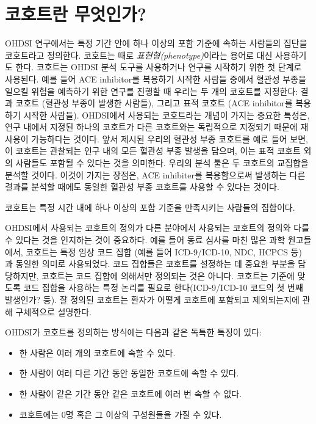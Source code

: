 \documentclass[11pt]{book}
\providecommand{\tightlist}{%
  \setlength{\itemsep}{0pt}\setlength{\parskip}{0pt}}
\theoremstyle{definition}
\theoremstyle{definition}
\theoremstyle{definition}
\theoremstyle{remark}
\let\BeginKnitrBlock\begin \let\EndKnitrBlock\end
\begin{document}
\section{코호트란 무엇인가?}\label{-}

OHDSI 연구에서는 특정 기간 안에 하나 이상의 포함 기준에 속하는 사람들의
집단을 코호트라고 정의한다. 코호트는 때로 \emph{표현형(phenotype)}이라는
용어로 대신 사용하기도 한다. 코호트는 OHDSI 분석 도구를 사용하거나
연구를 시작하기 위한 첫 단계로 사용된다. 예를 들어 ACE inhibitor를
복용하기 시작한 사람들 중에서 혈관성 부종을 일으킬 위험을 예측하기 위한
연구를 진행할 때 우리는 두 개의 코호트를 지정한다: 결과 코호트 (혈관성
부종이 발생한 사람들), 그리고 표적 코호트 (ACE inhibitor를 복용하기
시작한 사람들). OHDSI에서 사용되는 코호트라는 개념이 가지는 중요한
특성은, 연구 내에서 지정된 하나의 코호트가 다른 코호트와는 독립적으로
지정되기 때문에 재사용이 가능하다는 것이다. 앞서 제시된 우리의 혈관성
부종 코호트를 예로 들어 보면, 이 코호트는 관찰되는 인구 내의 모든 혈관성
부종 발생을 담으며, 이는 표적 코호트 외의 사람들도 포함될 수 있다는 것을
의미한다. 우리의 분석 툴은 두 코호트의 교집합을 분석할 것이다. 이것이
가지는 장점은, ACE inhibiter를 복용함으로써 발생하는 다른 결과를 분석할
때에도 동일한 혈관성 부종 코호트를 사용할 수 있다는 것이다.

\BeginKnitrBlock{rmdimportant}
코호트는 특정 시간 내에 하나 이상의 포함 기준을 만족시키는 사람들의
집합이다.
\EndKnitrBlock{rmdimportant}

  OHDSI에서 사용되는 코호트의
정의가 다른 분야에서 사용되는 코호트의 정의와 다를 수 있다는 것을
인지하는 것이 중요하다. 예를 들어 동료 심사를 마친 많은 과학 원고들에서,
코호트는 특정 임상 코드 집합 (예를 들어 ICD-9/ICD-10, NDC, HCPCS 등) 과
동일한 의미로 사용되었다. 코드 집합들은 코호트를 설정하는 데 중요한
부분을 담당하지만, 코호트는 코드 집합에 의해서만 정의되는 것은 아니다.
코호트는 기준에 맞도록 코드 집합을 사용하는 특정 논리를 필요로
한다(ICD-9/ICD-10 코드의 첫 번째 발생인가? 등). 잘 정의된 코호트는
환자가 어떻게 코호트에 포함되고 제외되는지에 관해 구체적으로 설명한다.

 OHDSI가 코호트를 정의하는 방식에는 다음과 같은 독특한
특징이 있다:

\begin{itemize}
\tightlist
\item
  한 사람은 여러 개의 코호트에 속할 수 있다.
\item
  한 사람이 여러 다른 기간 동안 동일한 코호트에 속할 수 있다.
\item
  한 사람이 같은 기간 동안 같은 코호트에 여러 번 속할 수 없다.
\item
  코호트에는 0명 혹은 그 이상의 구성원들을 가질 수 있다.
\end{itemize}
\end{document}
